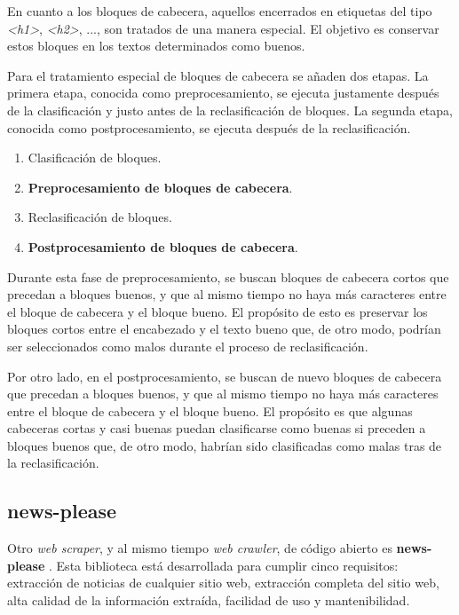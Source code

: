 En cuanto a los bloques de cabecera, aquellos encerrados en etiquetas del tipo \emph{<h1>}, \emph{<h2>}, 
..., son tratados de una manera especial. El objetivo es conservar estos bloques en los textos determinados 
como buenos.

Para el tratamiento especial de bloques de cabecera se añaden dos etapas. La primera etapa, conocida como 
preprocesamiento, se ejecuta justamente después de la clasificación y justo antes de la reclasificación de 
bloques. La segunda etapa, conocida como postprocesamiento, se ejecuta después de la reclasificación.

\begin{enumerate}
  \item Clasificación de bloques.
  \item \textbf{Preprocesamiento de bloques de cabecera}.
  \item Reclasificación de bloques.
  \item \textbf{Postprocesamiento de bloques de cabecera}.
\end{enumerate}

Durante esta fase de preprocesamiento, se buscan bloques de cabecera cortos que precedan a bloques buenos, 
y que al mismo tiempo no haya más caracteres entre el bloque de cabecera y el bloque bueno. El propósito 
de esto es preservar los bloques cortos entre el encabezado y el texto bueno que, de otro modo, podrían 
ser seleccionados como malos durante el proceso de reclasificación.

Por otro lado, en el postprocesamiento, se buscan de nuevo bloques de cabecera que precedan a bloques
buenos, y que al mismo tiempo no haya más caracteres entre el bloque de cabecera y el bloque bueno. El
propósito es que algunas cabeceras cortas y casi buenas puedan clasificarse como buenas si preceden a
bloques buenos que, de otro modo, habrían sido clasificadas como malas tras de la reclasificación.

\subsection{news-please}
\label{subsec:news-please}

Otro \emph{web scraper}, y al mismo tiempo \emph{web crawler}, de código abierto es \textbf{news-please}
\cite{news-please}. Esta biblioteca está desarrollada para cumplir cinco requisitos: extracción de
noticias de cualquier sitio web, extracción completa del sitio web, alta calidad de la información
extraída, facilidad de uso y mantenibilidad.

